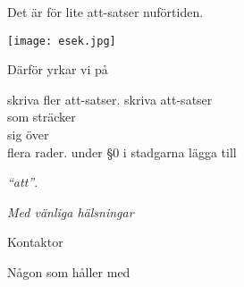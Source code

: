 \documentclass[../main/handlingar.tex]{subfiles}
\begin{document}

Det är för lite att-satser nuförtiden.

\begin{center}
    \texttt{[image: esek.jpg]}
\end{center}

Därför yrkar vi på
\begin{attsatser}
    \att skriva fler att-satser.
    \att
    skriva att-satser\\
    som sträcker\\
    sig över\\
    flera rader.
    \att under \S0 i stadgarna lägga till\par
    \emph{``att''}.
\end{attsatser}

\begin{signatures}{2}
    \emph{Med vänliga hälsningar}
    \signature{Erik Månsson}{Kontaktor}
    \signature{Måns Eriksson}{Någon som håller med}
\end{signatures}
\end{document}
